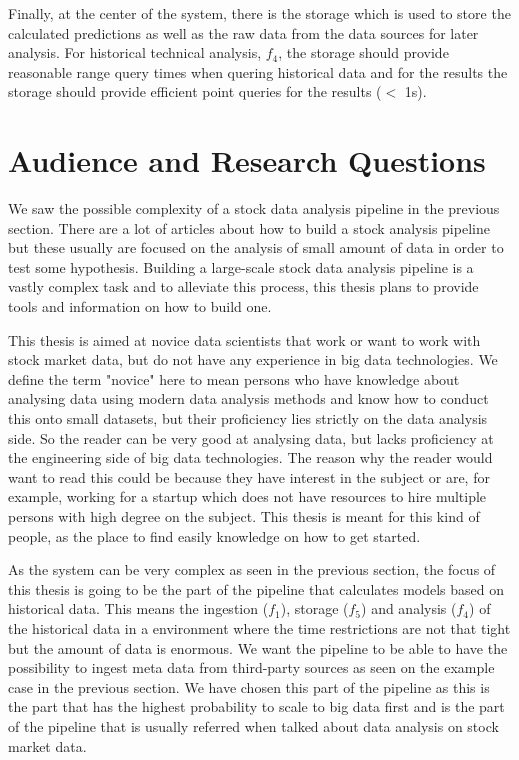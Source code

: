 Finally, at the center of the system, there is the storage which is used to store the calculated predictions as well as the raw data from the data sources for later analysis.
For historical technical analysis, $f_4$, the storage should provide reasonable range query times when quering historical data and for the results the storage should provide efficient point queries for the results ($<$ 1s).

\section{Audience and Research Questions}

We saw the possible complexity of a stock data analysis pipeline in the previous section.
There are a lot of articles about how to build a stock analysis pipeline but these usually are focused on the analysis of small amount of data in order to test some hypothesis.
Building a large-scale stock data analysis pipeline is a vastly complex task and to alleviate this process, this thesis plans to provide tools and information on how to build one.

This thesis is aimed at novice data scientists that work or want to work with stock market data, but do not have any experience in big data technologies.
We define the term "novice" here to mean persons who have knowledge about analysing data using modern data analysis methods and know how to conduct this onto small datasets, but their proficiency lies strictly on the data analysis side.
So the reader can be very good at analysing data, but lacks proficiency at the engineering side of big data technologies.
The reason why the reader would want to read this could be because they have interest in the subject or are, for example, working for a startup which does not have resources to hire multiple persons with high degree on the subject.
This thesis is meant for this kind of people, as the place to find easily knowledge on how to get started.

As the system can be very complex as seen in the previous section, the focus of this thesis is going to be the part of the pipeline that calculates models based on historical data.
This means the ingestion ($f_1$), storage ($f_5$) and analysis ($f_4$) of the historical data in a environment where the time restrictions are not that tight but the amount of data is enormous.
We want the pipeline to be able to have the possibility to ingest meta data from third-party sources as seen on the example case in the previous section.
We have chosen this part of the pipeline as this is the part that has the highest probability to scale to big data first and is the part of the pipeline that is usually referred when talked about data analysis on stock market data.

